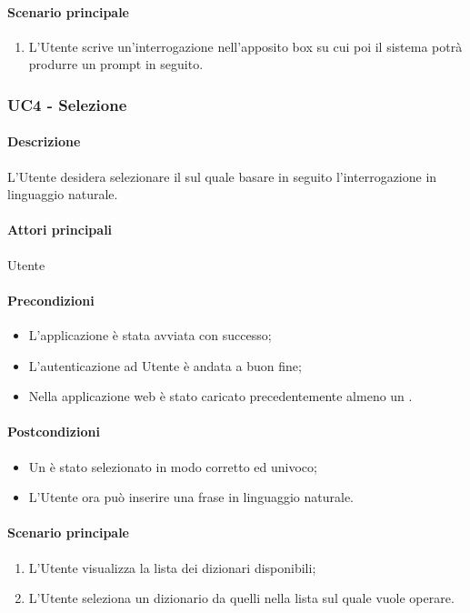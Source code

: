 \paragraph*{Scenario principale}
\begin{enumerate}
  \item L’Utente scrive un'interrogazione nell’apposito box su cui poi il sistema potrà produrre un prompt in seguito.
\end{enumerate}


\subsubsection{UC4 - Selezione }\label{UC4}
\paragraph*{Descrizione}
L’Utente desidera selezionare il  sul quale basare in seguito l’interrogazione in linguaggio naturale.
\paragraph*{Attori principali} Utente

\paragraph*{Precondizioni}
\begin{itemize}
  \item L'applicazione è stata avviata con successo;
  \item L’autenticazione ad Utente è andata a buon fine;
  \item Nella applicazione web è stato caricato precedentemente almeno un .
\end{itemize}

\paragraph*{Postcondizioni}
\begin{itemize}
  \item Un  è stato selezionato in modo corretto ed univoco;
  \item L’Utente ora può inserire una frase in linguaggio naturale.
\end{itemize}

\paragraph*{Scenario principale}
\begin{enumerate}
  \item L’Utente visualizza la lista dei dizionari disponibili;
  \item L’Utente seleziona un dizionario da quelli nella lista sul quale vuole operare.
\end{enumerate}


